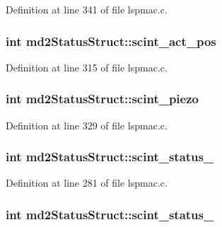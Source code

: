 Definition at line 341 of file lspmac.\-c.

\hypertarget{structmd2StatusStruct_a1c146fc792c4285eed5b2c446c214f98}{
\subsubsection[{scint\-\_\-act\-\_\-pos}]{\setlength{\rightskip}{0pt plus 5cm}int md2\-Status\-Struct\-::scint\-\_\-act\-\_\-pos}}\label{structmd2StatusStruct_a1c146fc792c4285eed5b2c446c214f98}


Definition at line 315 of file lspmac.\-c.

\hypertarget{structmd2StatusStruct_a031be48adfa016c637d6eae49054c435}{
\subsubsection[{scint\-\_\-piezo}]{\setlength{\rightskip}{0pt plus 5cm}int md2\-Status\-Struct\-::scint\-\_\-piezo}}\label{structmd2StatusStruct_a031be48adfa016c637d6eae49054c435}


Definition at line 329 of file lspmac.\-c.

\hypertarget{structmd2StatusStruct_a1723870357f428ac5c2758a2c9a475c7}{
\subsubsection[{scint\-\_\-status\-\_\-1}]{\setlength{\rightskip}{0pt plus 5cm}int md2\-Status\-Struct\-::scint\-\_\-status\-\_}}\label{structmd2StatusStruct_a1723870357f428ac5c2758a2c9a475c7}


Definition at line 281 of file lspmac.\-c.

\hypertarget{structmd2StatusStruct_a4e5bc72e2f4007370f1c29ea272c952f}{
\subsubsection[{scint\-\_\-status\-\_\-2}]{\setlength{\rightskip}{0pt plus 5cm}int md2\-Status\-Struct\-::scint\-\_\-status\-\_}}\label{structmd2StatusStruct_a4e5bc72e2f4007370f1c29ea272c952f}


